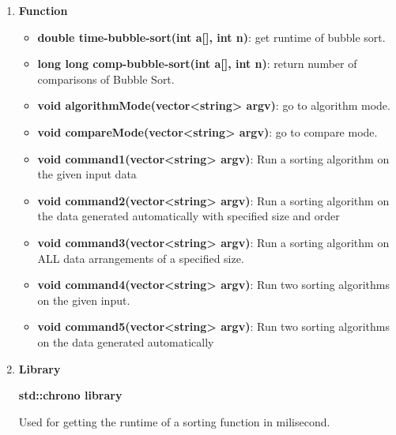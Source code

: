 \documentclass[11pt,a4paper]{article}
\begin{document}
{{\begin{enumerate}
\begin{itemize}
	                Include detail the implementation of each sorting functions
	        \end{itemize}
	    \item \textbf{Function}
	        \begin{itemize}
	            \item \textbf{double time-bubble-sort(int a[], int n)}: get runtime of bubble sort.
	            \item \textbf{long long comp-bubble-sort(int a[], int n)}: return number of comparisons of Bubble Sort.
	            \item \textbf{void algorithmMode(vector<string> argv)}: go to algorithm mode.
	            \item\textbf{void compareMode(vector<string> argv)}: go to compare mode.
	            \item\textbf{void command1(vector<string> argv)}: Run a sorting algorithm on the given input data
	            \item\textbf{void command2(vector<string> argv)}: Run a sorting algorithm on the data generated automatically with specified
size and order
                \item\textbf{void command3(vector<string> argv)}: Run a sorting algorithm on ALL data arrangements of a specified size.
                \item\textbf{void command4(vector<string> argv)}: Run two sorting algorithms on the given input.
                \item\textbf{void command5(vector<string> argv)}: Run two sorting algorithms on the data generated automatically
	        \end{itemize}
	    \item \textbf{Library}
	    
	        \textbf{std::chrono library}
	        
	            Used for getting the runtime of a sorting function in milisecond.
	            

\end{enumerate}}}
\end{document}
